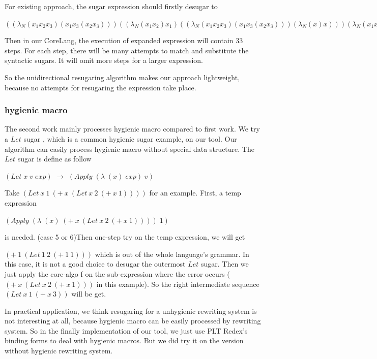 For existing approach, the sugar expression should firstly desugar to
\begin{flushleft}
$((\lambda _{N}
   (x_{1} x_{2} x_{3})
   (x_{1} x_{3} (x_{2} x_{3})))
  ((\lambda _{N} (x_{1} x_{2}) x_{1})
   ((\lambda _{N}
     (x_{1} x_{2} x_{3})
     (x_{1} x_{3} (x_{2} x_{3})))
    (\lambda _{N} (x) x)))
  (\lambda _{N} (x_{1} x_{2}) x_{1})
  xx
  yy)$
\end{flushleft}

Then in our CoreLang, the execution of expanded expression will contain 33 steps. For each step, there will be many attempts to match and substitute the syntactic sugars. It will omit more steps for a larger expression. 

So the unidirectional resugaring algorithm makes our approach lightweight, because no attempts for resugaring the expression take place.

\subsubsection{hygienic macro}
\label{mark:hygienic}

The second work\cite{hygienic} mainly processes hygienic macro compared to first work. We try a $Let$ sugar , which is a common hygienic sugar example, on our tool. Our algorithm can easily process hygienic macro without special data structure. The $Let$ sugar is define as follow

$(Let\;x\;v\;exp)$ $\rightarrow$ $(Apply\;(\lambda\;(x)\;exp)\;v)$

Take $(Let~x~1~(+~x~(Let~x~2~(+~x~1))))$ for an example. First, a temp expression

$(Apply\;(\lambda\;(x)\;(+~x~(Let~x~2~(+~x~1))))\;1)$

is needed. (case 5 or 6)Then one-step try on the temp expression, we will get

$(+~1~(Let~1~2~(+~1~1)))$ which is out of the whole language's grammar. In this case, it is not a good choice to desugar the outermost $Let$ sugar. Then we just apply the core-algo f on the sub-expression where the error occurs ($(+~x~(Let~x~2~(+~x~1)))$ in this example). So the right intermediate sequence $(Let~x~1~(+~x~3))$ will be get.

In practical application, we think resugaring for a unhygienic rewriting system is not interesting at all, because hygienic macro can be easily processed by rewriting system. So in the finally implementation of our tool, we just use PLT Redex's binding forms to deal with hygienic macros. But we did try it on the version without hygienic rewriting system.

